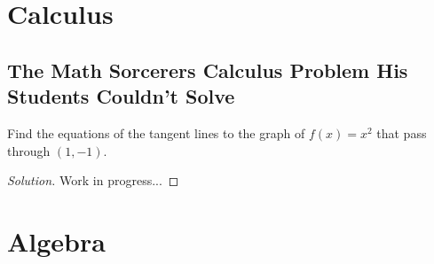 \documentclass[11pt]{article}
\begin{document}
\newpage

\section{Calculus}
\subsection{The Math Sorcerers Calculus Problem His Students Couldn't Solve}
Find the equations of the tangent lines to the graph of $f(x) = x^2$ that pass through $(1,-1)$.
\renewcommand\qedsymbol{$\diagup\!\!\!\diagup$}
\begin{proof}[Solution]
Work in progress...
\end{proof}

\newpage

\section{Algebra}
\end{document}
